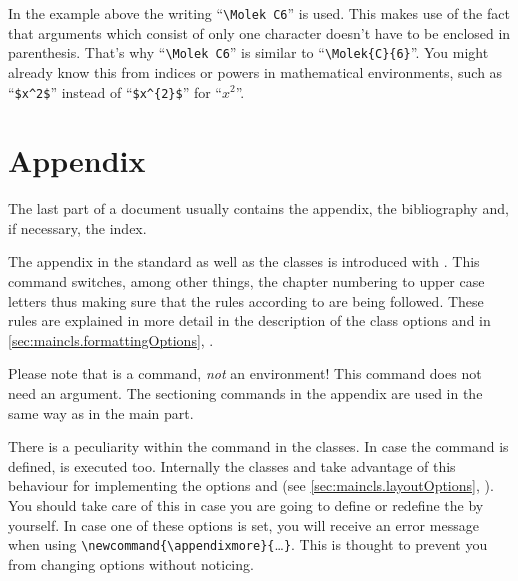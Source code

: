 \begin{Explain}
  In the example above the writing ``\verb|\Molek C6|'' is used. This
  makes use of the fact that arguments which consist of only one
  character doesn't have to be enclosed in parenthesis. That's why
  ``\verb|\Molek C6|'' is similar to ``\verb|\Molek{C}{6}|''. You
  might already know this from indices or powers in mathematical
  environments, such as ``\verb|$x^2$|'' instead of ``\verb|$x^{2}$|''
  for ``$x^2$''.
\end{Explain}
%
%



\section{Appendix}
\label{sec:maincls.appendix}

The last part of a document usually contains the
appendix, the bibliography and, if
necessary, the index.

\begin{Declaration}
\end{Declaration}%
%
The appendix in the standard as well as the {\KOMAScript} classes is
introduced with . This command switches, among other
things, the chapter numbering to upper case letters thus making sure
that the rules according to \cite{DUDEN} are being followed. These
rules are explained in more detail in the description of the class
options  and  in
\autoref{sec:maincls.formattingOptions},
.

Please note that  is a command, \emph{not} an
environment!  This command does not need an argument. The sectioning
commands in the appendix are used in the same way as in the main part.

%


\begin{Declaration}
\end{Declaration}%
%
There is a peculiarity within the  command in the
{\KOMAScript} classes. In case the command  is
defined,  is executed too. Internally the
{\KOMAScript} classes  and  take
advantage of this behaviour for implementing the options
 and  (see
\autoref{sec:maincls.layoutOptions},
). You should take care of this
in case you are going to define or redefine the 
by yourself. In case one of these options is set, you will receive an
error message when using
\verb|\newcommand{\appendixmore}{|\dots\verb|}|. This is thought to
prevent you from changing options without noticing.

